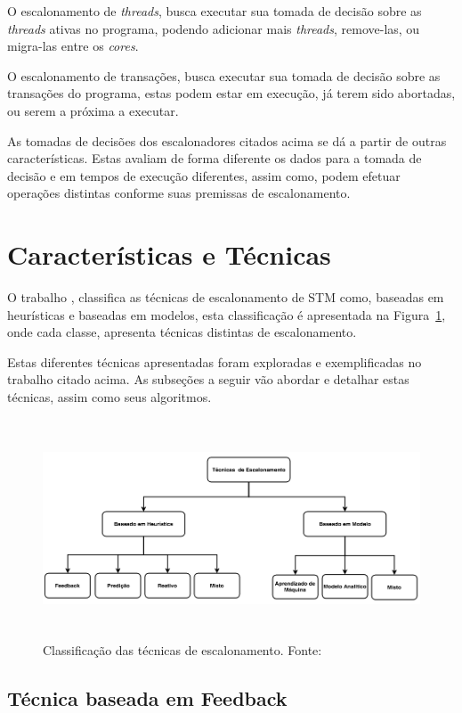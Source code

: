 \documentclass[ti]{texufpel} %
\begin{document}
  O escalonamento de \emph{threads}, busca executar sua tomada de decisão sobre as \emph{threads} ativas no programa, podendo adicionar mais \emph{threads}, remove-las, ou migra-las entre os \emph{cores}.

  O escalonamento de transações, busca executar sua tomada de decisão sobre as transações do programa, estas podem estar em execução, já terem sido abortadas, ou serem a próxima a executar.

  As tomadas de decisões dos escalonadores citados acima se dá a partir de outras características. Estas avaliam de forma diferente os dados para a tomada de decisão e em tempos de execução diferentes, assim como, podem efetuar operações distintas conforme suas premissas de escalonamento.

\section{Características e Técnicas}

O trabalho \cite{sanzo17}, classifica as técnicas de escalonamento de STM como, baseadas em heurísticas e baseadas em modelos, esta classificação é apresentada na Figura~\ref{figuraCategoria}, onde cada classe, apresenta técnicas distintas de escalonamento.

Estas diferentes técnicas apresentadas foram exploradas e exemplificadas no trabalho citado acima. As subseções a seguir vão abordar e detalhar estas técnicas, assim como seus algoritmos.

\begin{figure}[!htp]
\centering
\includegraphics[height=6.5cm]{Imagens/categoriasEscalonamento.png}
\caption{Classificação das técnicas de escalonamento. Fonte:~\cite{sanzo17}}
\label{figuraCategoria}
\end{figure}

\subsection{Técnica baseada em Feedback}
\end{document}
